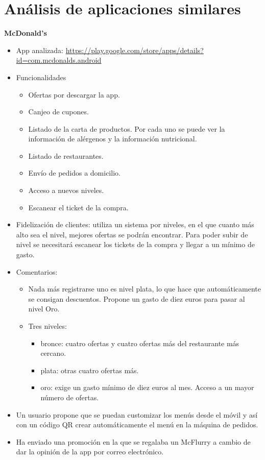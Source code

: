 \documentclass[twoside]{report}
\begin{document}
\section{Análisis de aplicaciones similares}
\textbf{McDonald's}\\
\begin{itemize}
\item App analizada: \url{https://play.google.com/store/apps/details?id=com.mcdonalds.android}
\item Funcionalidades
	\begin{itemize}
	\item Ofertas por descargar la app.
	\item Canjeo de cupones.
	\item Listado de la carta de productos. Por cada uno se puede ver la información de alérgenos y la información nutricional.
	\item Listado de restaurantes.
	\item Envío de pedidos a domicilio.
	\item Acceso a nuevos niveles.
	\item Escanear el ticket de la compra.
	\end{itemize}
\item Fidelización de clientes: utiliza un sistema por niveles, en el que cuanto más alto sea el nivel, mejores ofertas se podrán encontrar. Para poder subir de nivel se necesitará escanear los tickets de la compra y llegar a un mínimo de gasto.
\item Comentarios: 
	\begin{itemize}
	\item Nada más registrarse uno es nivel plata, lo que hace que automáticamente se consigan descuentos. Propone un gasto de diez euros para pasar al nivel Oro.
	\item Tres niveles: 
		\begin{itemize}
		\item bronce: cuatro ofertas y cuatro ofertas más del restaurante más cercano.
		\item plata: otras cuatro ofertas más.
		\item oro: exige un gasto mínimo de diez euros al mes. Acceso a un mayor número de ofertas.
		\end{itemize}
	\end{itemize}
	\item Un usuario propone que se puedan customizar los menús desde el móvil y así con un código QR crear automáticamente el menú en la máquina de pedidos.
	\item Ha enviado una promoción en la que se regalaba un McFlurry a cambio de dar la opinión de la app por correo electrónico.
\end{itemize}
\end{document}
